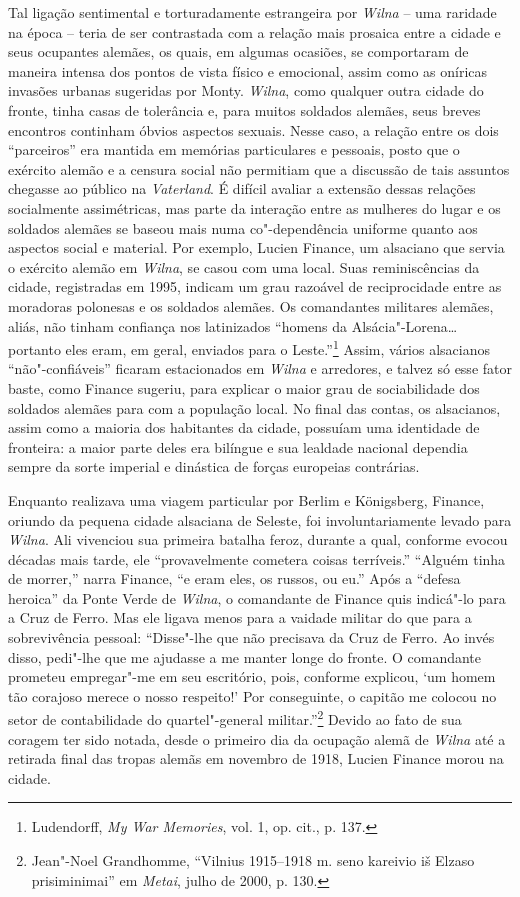 Tal ligação sentimental e torturadamente estrangeira por \textit{Wilna} -- uma
raridade na época -- teria de ser contrastada com a relação mais prosaica
entre a cidade e seus ocupantes alemães, os quais, em algumas ocasiões,
se comportaram de maneira intensa dos pontos de vista físico e
emocional, assim como as oníricas invasões urbanas sugeridas por Monty.
\textit{Wilna}, como qualquer outra cidade do fronte, tinha casas de tolerância
e, para muitos soldados alemães, seus breves encontros continham óbvios
aspectos sexuais. Nesse caso, a relação entre os dois ``parceiros'' era
mantida em memórias particulares e pessoais, posto que o exército alemão
e a censura social não permitiam que a discussão de tais assuntos
chegasse ao público na \textit{Vaterland}. É difícil avaliar a extensão
dessas relações socialmente assimétricas, mas parte da interação entre
as mulheres do lugar e os soldados alemães se baseou mais numa
co"-dependência uniforme quanto aos aspectos social e material. Por
exemplo, Lucien Finance, um alsaciano que servia o exército alemão em
\textit{Wilna}, se casou com uma local. Suas reminiscências da cidade, registradas em 1995, 
indicam um grau razoável de reciprocidade entre
as moradoras polonesas e os soldados alemães. Os comandantes militares
alemães, aliás, não tinham confiança nos latinizados ``homens da
Alsácia"-Lorena\ldots{} portanto eles eram, em geral, enviados para o
Leste.''\footnote{Ludendorff, \textit{My War Memories}, vol. 1, op. cit., p. 137.} Assim, vários alsacianos ``não"-confiáveis'' ficaram estacionados em \textit{Wilna} e arredores, e talvez só esse fator baste, como
Finance sugeriu, para explicar o maior grau de sociabilidade dos
soldados alemães para com a população local. No final das contas, os
alsacianos, assim como a maioria dos habitantes da cidade, possuíam uma
identidade de fronteira: a maior parte deles era bilíngue e sua lealdade
nacional dependia sempre da sorte imperial e dinástica de forças
europeias contrárias.

Enquanto realizava uma viagem particular por Berlim e Königsberg,
Finance, oriundo da pequena cidade alsaciana de Seleste, foi
involuntariamente levado para \textit{Wilna}. Ali vivenciou sua primeira batalha
feroz, durante a qual, conforme evocou décadas mais tarde, ele
``provavelmente cometera coisas terríveis.'' ``Alguém tinha de morrer,''
narra Finance, ``e eram eles, os russos, ou eu.'' Após a ``defesa
heroica'' da Ponte Verde de \textit{Wilna}, o comandante de Finance quis
indicá"-lo para a Cruz de Ferro. Mas ele ligava menos para a vaidade
militar do que para a sobrevivência pessoal: ``Disse"-lhe que não
precisava da Cruz de Ferro. Ao invés disso, pedi"-lhe que me ajudasse a
me manter longe do fronte. O comandante prometeu empregar"-me em seu
escritório, pois, conforme explicou, `um homem tão corajoso merece o
nosso respeito!' Por conseguinte, o capitão me colocou no setor de
contabilidade do quartel"-general militar.''\footnote{Jean"-Noel Grandhomme, ``Vilnius 1915--1918 m. seno kareivio iš Elzaso prisiminimai'' em \textit{Metai}, julho de 2000, p. 130.} Devido ao fato de sua coragem ter sido notada, desde o primeiro dia da ocupação alemã
de \textit{Wilna} até a retirada final das tropas alemãs em novembro de 1918,
Lucien Finance morou na cidade.

